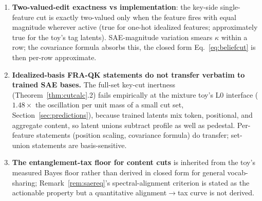 \documentclass{article}
\begin{document}
\begin{enumerate}
    \item \textbf{Two-valued-edit exactness vs implementation}: the key-side single-feature cut is exactly two-valued only when the feature fires with equal magnitude wherever active (true for one-hot idealized features; approximately true for the toy's tag latents). SAE-magnitude variation smears $\kappa$ within a row; the covariance formula absorbs this, the closed form Eq.~\eqref{eq:beliefcut} is then per-row approximate.
    \item \textbf{Idealized-basis FRA-QK statements do not transfer verbatim to trained SAE bases.} The full-set key-cut inertness (Theorem~\ref{thm:cutcalc}.2) fails empirically at the mixture toy's L0 interface ($1.48\times$ the oscillation per unit mass of a small cut set, Section~\ref{sec:predictions}), because trained latents mix token, positional, and aggregate content, so latent unions subtract profile as well as pedestal. Per-feature statements (position scaling, covariance formula) do transfer; set-union statements are basis-sensitive.
    \item \textbf{The entanglement-tax floor for content cuts} is inherited from the toy's measured Bayes floor rather than derived in closed form for general vocab-sharing; Remark~\ref{rem:saereq}'s spectral-alignment criterion is stated as the actionable property but a quantitative alignment$\to$tax curve is not derived.
\end{enumerate}
\end{document}
